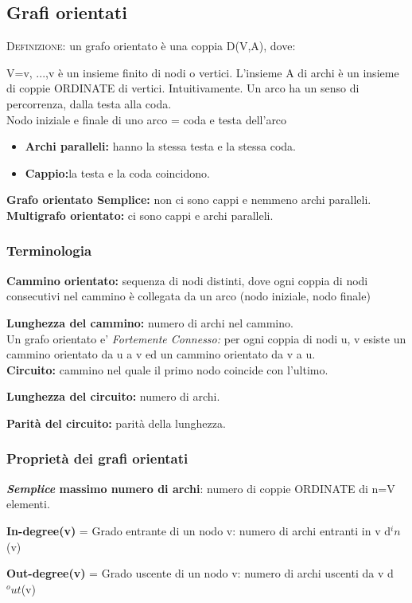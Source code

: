 \documentclass[12pt,a4paper]{article}
\begin{document}
\subsection{Grafi orientati}
\textsc{Definizione:} un grafo orientato è una coppia D(V,A), dove: \par
V={v, ...,v} è un insieme finito di nodi o vertici. L'insieme A di archi è un insieme di coppie ORDINATE di vertici. Intuitivamente. Un arco ha un senso di percorrenza, dalla testa alla coda. \\

Nodo iniziale e finale di uno arco = coda e testa dell'arco\\
\begin{itemize}
\item \textbf{Archi paralleli:} hanno la stessa testa e la stessa coda.
\item \textbf{Cappio:}la testa e la coda coincidono.
\end{itemize}
\textbf{Grafo orientato Semplice:} non ci sono cappi e nemmeno archi paralleli.
\textbf{Multigrafo orientato:} ci sono cappi e archi paralleli. \\

\subsubsection{Terminologia}
\textbf{Cammino orientato:} sequenza di nodi distinti, dove ogni coppia di nodi consecutivi nel cammino è
collegata da un arco (nodo iniziale, nodo finale) \par
\textbf{Lunghezza del cammino:} numero di archi nel cammino. \\

Un grafo orientato e' \textit{Fortemente Connesso:} per ogni coppia di nodi u, v esiste un cammino orientato da u
a v ed un cammino orientato da v a u. \\

\textbf{Circuito:} cammino nel quale il primo nodo coincide con l'ultimo. \par
\textbf{Lunghezza del circuito:} numero di archi. \par
\textbf{Parità del circuito:} parità della lunghezza. \\

\subsubsection{Proprietà dei grafi orientati}
\textbf{\textit{Semplice} massimo numero di archi}: numero di coppie ORDINATE di n=\mid V \mid elementi. \par
\textbf{In-degree(v)} = Grado entrante di un nodo v: numero di archi entranti in v \Rightarrow d$^in$(v) \par
\textbf{Out-degree(v)} = Grado uscente di un nodo v: numero di archi uscenti da v \Rightarrow d$^out$(v) \\
\end{document}
